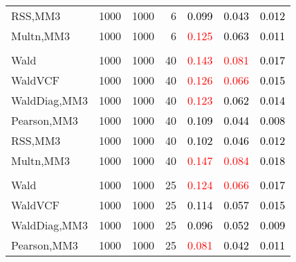 \documentclass[
]{article}
\begin{document}
\begin{table}[H]
{\begin{tabular}[t]{lrrrrrr}
\hspace{1em}RSS,MM3 & 1000 & 1000 & 6 & \textcolor{black}{0.099} & \textcolor{black}{0.043} & \textcolor{black}{0.012}\\
\hspace{1em}Multn,MM3 & 1000 & 1000 & 6 & \textcolor{red}{0.125} & \textcolor{black}{0.063} & \textcolor{black}{0.011}\\
\addlinespace[0.3em]
\multicolumn{7}{l}{\textbf{1F 15V}}\\
\hspace{1em}Wald & 1000 & 1000 & 40 & \textcolor{red}{0.143} & \textcolor{red}{0.081} & \textcolor{black}{0.017}\\
\hspace{1em}WaldVCF & 1000 & 1000 & 40 & \textcolor{red}{0.126} & \textcolor{red}{0.066} & \textcolor{black}{0.015}\\
\hspace{1em}WaldDiag,MM3 & 1000 & 1000 & 40 & \textcolor{red}{0.123} & \textcolor{black}{0.062} & \textcolor{black}{0.014}\\
\hspace{1em}Pearson,MM3 & 1000 & 1000 & 40 & \textcolor{black}{0.109} & \textcolor{black}{0.044} & \textcolor{black}{0.008}\\
\hspace{1em}RSS,MM3 & 1000 & 1000 & 40 & \textcolor{black}{0.102} & \textcolor{black}{0.046} & \textcolor{black}{0.012}\\
\hspace{1em}Multn,MM3 & 1000 & 1000 & 40 & \textcolor{red}{0.147} & \textcolor{red}{0.084} & \textcolor{black}{0.018}\\
\addlinespace[0.3em]
\multicolumn{7}{l}{\textbf{2F 10V}}\\
\hspace{1em}Wald & 1000 & 1000 & 25 & \textcolor{red}{0.124} & \textcolor{red}{0.066} & \textcolor{black}{0.017}\\
\hspace{1em}WaldVCF & 1000 & 1000 & 25 & \textcolor{black}{0.114} & \textcolor{black}{0.057} & \textcolor{black}{0.015}\\
\hspace{1em}WaldDiag,MM3 & 1000 & 1000 & 25 & \textcolor{black}{0.096} & \textcolor{black}{0.052} & \textcolor{black}{0.009}\\
\hspace{1em}Pearson,MM3 & 1000 & 1000 & 25 & \textcolor{red}{0.081} & \textcolor{black}{0.042} & \textcolor{black}{0.011}\\

\end{tabular}}
\end{table}
\end{document}
